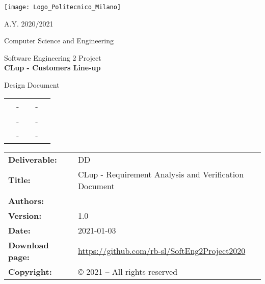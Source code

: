 


	
	\begin{titlepage}
		
		\centering
		\texttt{[image: Logo\_Politecnico\_Milano]}
		
		\Large 
		A.Y. 2020/2021
		
		Computer Science and Engineering
		
		\LARGE
		Software Engineering 2 Project
		\\ [3cm]
		
		\textbf{\color{Blue} \Huge CLup - Customers Line-up}
		
		Design Document
		\\ [1cm]
	
		\Large
		\begin{tabu}{ccccc}
			& - & & - & \\
			& - & & - & \\
			& - & & - & 
		\end{tabu}
	
	\end{titlepage}
	
	\begin{table}[h!]
		\begin{tabu} to \textwidth { X[0.3,r,p] X[0.7,l,p] }
			\hline
			\textbf{Deliverable:} 	& DD\\
			\textbf{Title:} 		& CLup - Requirement Analysis and Verification Document \\
			\textbf{Authors:}		&  \\
			\textbf{Version:} 		& 1.0 \\ 
			\textbf{Date:} 			& 2021-01-03 \\
			\textbf{Download page:} & \href{https://github.com/rb-sl/SoftEng2Project2020}{https://github.com/rb-sl/SoftEng2Project2020} \\
			\textbf{Copyright:} 	& © 2021 – All rights reserved \\
			\hline
		\end{tabu}
	\end{table}
	
	\setcounter{page}{2}
	
	\newpage	
	\tableofcontents
	
